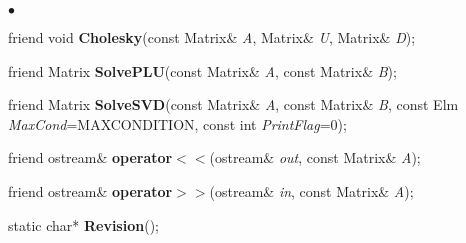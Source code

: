 \documentclass{article}
\newcommand{\Func}[1]{\textbf{#1}}
\newcommand{\var}[1]{\textit{#1}}
\newenvironment{LIST}{\begin{list}{$\bullet$}{%
      \setlength{\leftmargin}{2\leftmargin}%
      \setlength{\itemindent}{-1cm}}}%
  {\end{list}}
\begin{document}
\begin{LIST}
  \item friend void \Func{Cholesky}(const Matrix\& \var{A}, Matrix\& \var{U}, Matrix\& \var{D});\\

  \item friend Matrix \Func{SolvePLU}(const Matrix\& \var{A}, const Matrix\& \var{B});\\

  \item friend Matrix \Func{SolveSVD}(const Matrix\& \var{A}, const Matrix\&
   \var{B}, const Elm \var{MaxCond}=MAXCONDITION, const int
   \var{PrintFlag}=0);\\

  \item friend ostream\& \Func{operator$<<$}(ostream\& \var{out}, const Matrix\& \var{A});\\
  \item friend ostream\& \Func{operator$>>$}(ostream\& \var{in}, const Matrix\& \var{A});\\

  \item static char* \Func{Revision}();
 \end{LIST}
\end{document}
